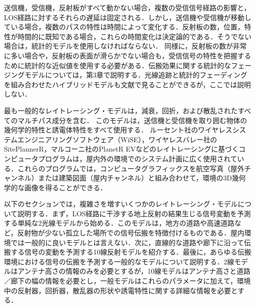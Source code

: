 \documentclass[dvipdfmx]{jsarticle}
\begin{document}
送信機，受信機，反射板がすべて動かない場合，複数の受信信号経路の影響と，LOS経路に対するそれらの遅延は固定される．しかし，送信機や受信機が移動している場合，複数のパスの特性は時間によって変化する．反射板の数，位置，特性が時間的に既知である場合，これらの時間変化は決定論的である．そうでない場合は，統計的モデルを使用しなければならない．
同様に，反射板の数が非常に多い場合や，反射板の表面が滑らかでない場合も，受信信号の特性を把握するために統計的な近似値を使用する必要がある．伝搬効果に関する統計的なフェージングモデルについては，第3章で説明する．光線追跡と統計的フェーディングを組み合わせたハイブリッドモデルも文献\cite{thirteen}\cite{fourteen}で見ることができるが，ここでは説明しない．

最も一般的なレイトレーシング・モデルは，減衰，回折，および散乱されたすべてのマルチパス成分を含む．
このモデルは，送信機と受信機を取り囲む物体の幾何学的特性と誘電体特性をすべて使用する．
ルーセント社のワイヤレスシステムエンジニアリングソフトウェア（WiSE），ワイヤレスバレー社のSitePlannerR，マルコーニ社のPlanetR EVなどのレイトレーシングに基づくコンピュータプログラムは，屋内外の環境でのシステム計画に広く使用されている．これらのプログラムでは，コンピュータグラフィックスを航空写真（屋外チャンネル）または建築図面（屋内チャンネル）と組み合わせて，環境の3D幾何学的な画像を得ることができる\cite{one}．

以下のセクションでは，複雑さを増すいくつかのレイトレーシング・モデルについて説明する．まず，LOS経路に干渉する地上反射の結果生じる信号変動を予測する単純な2光線モデルから始める．このモデルは，地方の道路や高速道路など，反射物が少ない孤立した場所での信号伝搬を特徴付けるものである．屋内環境では一般的に良いモデルとは言えない．次に，直線的な道路や廊下に沿って伝搬する信号の変動を予測する10線反射モデルを紹介する．最後に，あらゆる伝搬環境における信号の伝搬を予測する一般的なモデルについて説明する．2線モデルはアンテナ高さの情報のみを必要とするが，10線モデルはアンテナ高さと道路／廊下の幅の情報を必要とし，一般モデルはこれらのパラメータに加えて，環境中の反射器，回折器，散乱器の形状や誘電特性に関する詳細な情報を必要とする．
\end{document}
